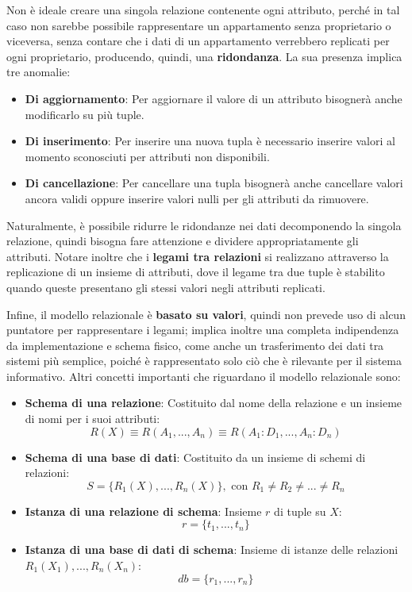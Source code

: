 \noindent Non è ideale creare una singola relazione contenente ogni attributo, perché in tal caso non sarebbe possibile rappresentare un appartamento
senza proprietario o viceversa, senza contare che i dati di un appartamento verrebbero replicati per ogni proprietario, producendo, quindi, una
\textbf{ridondanza}. La sua presenza implica tre anomalie: \begin{itemize}
    \item \textbf{Di aggiornamento}: Per aggiornare il valore di un attributo bisognerà anche modificarlo su più tuple.
    \item \textbf{Di inserimento}: Per inserire una nuova tupla è necessario inserire valori al momento sconosciuti per attributi non disponibili.
    \item \textbf{Di cancellazione}: Per cancellare una tupla bisognerà anche cancellare valori ancora validi oppure inserire valori nulli per gli
        attributi da rimuovere.
\end{itemize}

\noindent Naturalmente, è possibile ridurre le ridondanze nei dati decomponendo la singola relazione, quindi bisogna fare attenzione e dividere
appropriatamente gli attributi. Notare inoltre che i \textbf{legami tra relazioni} si realizzano attraverso la replicazione di un insieme di attributi,
dove il legame tra due tuple è stabilito quando queste presentano gli stessi valori negli attributi replicati.\par
Infine, il modello relazionale è \textbf{basato su valori}, quindi non prevede uso di alcun puntatore per rappresentare i legami; implica inoltre una
completa indipendenza da implementazione e schema fisico, come anche un trasferimento dei dati tra sistemi più semplice, poiché è rappresentato solo ciò
che è rilevante per il sistema informativo. Altri concetti importanti che riguardano il modello relazionale sono: \begin{itemize}
    \item \textbf{Schema di una relazione}: Costituito dal nome della relazione e un insieme di nomi per i suoi attributi: \[
        R(X) \equiv R(A_1, ..., A_n) \equiv R(A_1:D_1, ..., A_n:D_n)
    \]
    \item \textbf{Schema di una base di dati}: Costituito da un insieme di schemi di relazioni: \[
        S = \{R_1(X), ..., R_n(X)\}, \text{ con } R_1\neq R_2\neq ...\neq R_n
    \]
    \item \textbf{Istanza di una relazione di schema}: Insieme $r$ di tuple su $X$: \[
        r = \{t_1, ..., t_n\}
    \]
    \item \textbf{Istanza di una base di dati di schema}: Insieme di istanze delle relazioni $R_1(X_1), ..., R_n(X_n)$: \[
        db = \{r_1, ..., r_n\}
    \]
\end{itemize}

